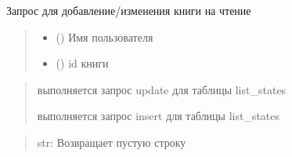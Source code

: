 \documentclass[letterpaper,10pt,russian]{sphinxmanual}
\begin{document}

\begin{fulllineitems}
\label{\detokenize{blueprints:blueprints.change_state.change_in_read}}
\pysigstartsignatures
{}
\pysigstopsignatures
\sphinxAtStartPar
Запрос для добавление/изменения книги на чтение
\begin{quote}\begin{description}
\begin{itemize}
\item {} 
\sphinxAtStartPar
{} () \textendash{} Имя пользователя

\item {} 
\sphinxAtStartPar
{} () \textendash{} id книги

\end{itemize}

\end{description}\end{quote}
\begin{description}
\begin{quote}\begin{description}
\sphinxAtStartPar
выполняется запрос update для таблицы list\_states

\sphinxAtStartPar
выполняется запрос insert для таблицы list\_states

\end{description}\end{quote}

\end{description}
\begin{quote}\begin{description}
\sphinxAtStartPar
str: Возвращает пустую строку

\end{description}\end{quote}

\end{fulllineitems}
\end{document}
